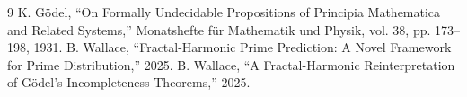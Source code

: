 \documentclass[12pt]{article}
\begin{document}
\begin{thebibliography}{9}
 K. Gödel, ``On Formally Undecidable Propositions of Principia Mathematica and Related Systems,'' Monatshefte für Mathematik und Physik, vol. 38, pp. 173--198, 1931.
 B. Wallace, ``Fractal-Harmonic Prime Prediction: A Novel Framework for Prime Distribution,'' 2025.
 B. Wallace, ``A Fractal-Harmonic Reinterpretation of Gödel's Incompleteness Theorems,'' 2025.
\end{thebibliography}
\end{document}
